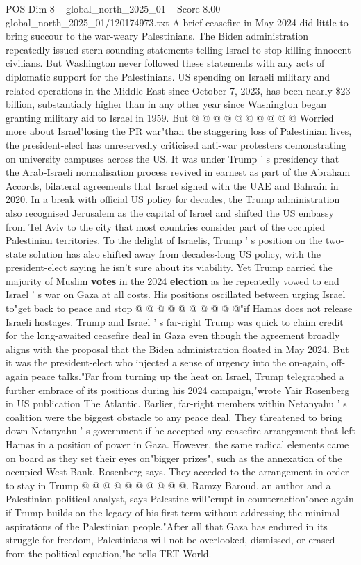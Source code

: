 \begin{textsample}{POS Dim 8 – global\_north\_2025\_01 – Score 8.00 – global\_north\_2025\_01/120174973.txt}
A brief ceasefire in May 2024 did little to bring succour to the war-weary Palestinians.
The Biden administration repeatedly issued stern-sounding statements telling Israel to stop killing innocent civilians.
But Washington never followed these statements with any acts of diplomatic support for the Palestinians.
US spending on Israeli military and related operations in the Middle East since October 7, 2023, has been nearly \$23 billion, substantially higher than in any other year since Washington began granting military aid to Israel in 1959.
But @ @ @ @ @ @ @ @ @ @ Worried more about Israel"losing the PR war"than the staggering loss of Palestinian lives, the president-elect has unreservedly criticised anti-war protesters demonstrating on university campuses across the US.
It was under Trump ' s presidency that the Arab-Israeli normalisation process revived in earnest as part of the Abraham Accords, bilateral agreements that Israel signed with the UAE and Bahrain in 2020.
In a break with official US policy for decades, the Trump administration also recognised Jerusalem as the capital of Israel and shifted the US embassy from Tel Aviv to the city that most countries consider part of the occupied Palestinian territories.
To the delight of Israelis, Trump ' s position on the two-state solution has also shifted away from decades-long US policy, with the president-elect saying he isn't sure about its viability.
Yet Trump carried the majority of Muslim \textbf{votes} in the 2024 \textbf{election} as he repeatedly vowed to end Israel ' s war on Gaza at all costs.
His positions oscillated between urging Israel to"get back to peace and stop @ @ @ @ @ @ @ @ @ @"if Hamas does not release Israeli hostages.
Trump and Israel ' s far-right Trump was quick to claim credit for the long-awaited ceasefire deal in Gaza even though the agreement broadly aligns with the proposal that the Biden administration floated in May 2024.
But it was the president-elect who injected a sense of urgency into the on-again, off-again peace talks."Far from turning up the heat on Israel, Trump telegraphed a further embrace of its positions during his 2024 campaign,"wrote Yair Rosenberg in US publication The Atlantic.
Earlier, far-right members within Netanyahu ' s coalition were the biggest obstacle to any peace deal.
They threatened to bring down Netanyahu ' s government if he accepted any ceasefire arrangement that left Hamas in a position of power in Gaza.
However, the same radical elements came on board as they set their eyes on"bigger prizes", such as the annexation of the occupied West Bank, Rosenberg says.
They acceded to the arrangement in order to stay in Trump @ @ @ @ @ @ @ @ @ @.
Ramzy Baroud, an author and a Palestinian political analyst, says Palestine will"erupt in counteraction"once again if Trump builds on the legacy of his first term without addressing the minimal aspirations of the Palestinian people."After all that Gaza has endured in its struggle for freedom, Palestinians will not be overlooked, dismissed, or erased from the political equation,"he tells TRT World.

\end{textsample}
